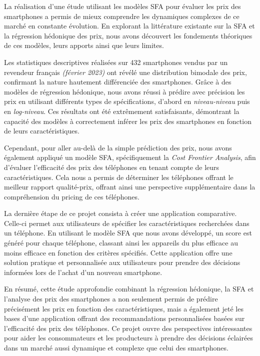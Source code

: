 \documentclass[
  12pt,
]{report}
\begin{document}
La réalisation d'une étude utilisant les modèles SFA pour évaluer les
prix des smartphones a permis de mieux comprendre les dynamiques
complexes de ce marché en constante évolution. En explorant la
littérature existante sur la SFA et la régression hédonique des prix,
nous avons découvert les fondements théoriques de ces modèles, leurs
apports ainsi que leurs limites.

Les statistiques descriptives réalisées sur 432 smartphones vendus par
un revendeur français \emph{(février 2023)} ont révélé une distribution
bimodale des prix, confirmant la nature hautement différenciée des
smartphones. Grâce à des modèles de régression hédonique, nous avons
réussi à prédire avec précision les prix en utilisant différents types
de spécifications, d'abord en \emph{niveau-niveau} puis en
\emph{log-niveau}. Ces résultats ont été extrêmement satisfaisants,
démontrant la capacité des modèles à correctement inférer les prix des
smartphones en fonction de leurs caractéristiques.

Cependant, pour aller au-delà de la simple prédiction des prix, nous
avons également appliqué un modèle SFA, spécifiquement la \emph{Cost
Frontier Analysis}, afin d'évaluer l'efficacité des prix des téléphones
en tenant compte de leurs caractéristiques. Cela nous a permis de
déterminer les téléphones offrant le meilleur rapport qualité-prix,
offrant ainsi une perspective supplémentaire dans la compréhension du
pricing de ces téléphones.

La dernière étape de ce projet consista à créer une application
comparative. Celle-ci permet aux utilisateurs de spécifier les
caractéristiques recherchées dans un téléphone. En utilisant le modèle
SFA que nous avons développé, un score est généré pour chaque téléphone,
classant ainsi les appareils du plus efficace au moins efficace en
fonction des critères spécifiés. Cette application offre une solution
pratique et personnalisée aux utilisateurs pour prendre des décisions
informées lors de l'achat d'un nouveau smartphone.

En résumé, cette étude approfondie combinant la régression hédonique, la
SFA et l'analyse des prix des smartphones a non seulement permis de
prédire précisément les prix en fonction des caractéristiques, mais a
également jeté les bases d'une application offrant des recommandations
personnalisées basées sur l'efficacité des prix des téléphones. Ce
projet ouvre des perspectives intéressantes pour aider les consommateurs
et les producteurs à prendre des décisions éclairées dans un marché
aussi dynamique et complexe que celui des smartphones.
\end{document}
